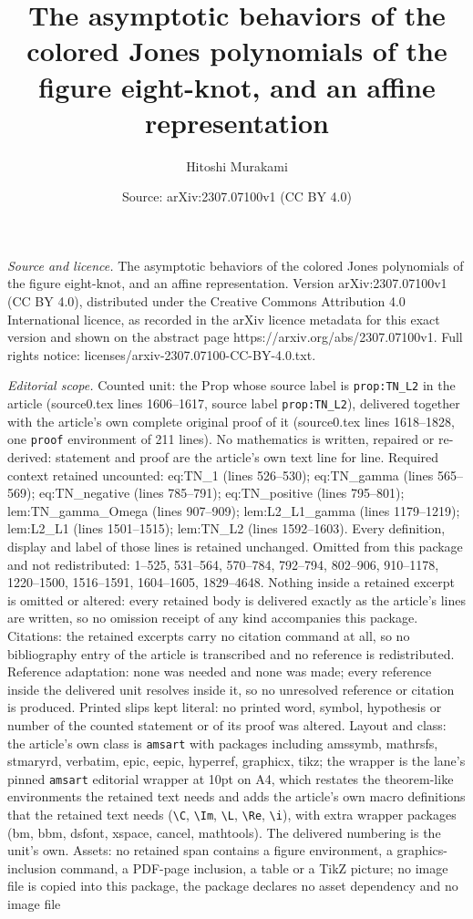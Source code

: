 \documentclass[10pt,a4paper]{amsart}
\title[The asymptotic behaviors of the colored Jones polynomials of]{The asymptotic behaviors of the colored Jones polynomials of the figure eight-knot, and an affine representation}
\author{Hitoshi Murakami}
\date{Source: arXiv:2307.07100v1 (CC BY 4.0)}
\begin{document}
\maketitle

\noindent\emph{Source and licence.} The asymptotic behaviors of the colored Jones polynomials of the figure eight-knot, and an affine representation. Version arXiv:2307.07100v1 (CC BY 4.0), distributed under the Creative Commons Attribution 4.0 International licence, as recorded in the arXiv licence metadata for this exact version and shown on the abstract page https://arxiv.org/abs/2307.07100v1. Full rights notice: licenses/arxiv-2307.07100-CC-BY-4.0.txt.\par\smallskip

\noindent\textit{Editorial scope.} Counted unit: the Prop whose source label is \texttt{prop:TN\_L2} in the article (source0.tex lines 1606--1617, source label \texttt{prop:TN\_L2}), delivered together with the article's own complete original proof of it (source0.tex lines 1618--1828, one \texttt{proof} environment of 211 lines). No mathematics is written, repaired or re-derived: statement and proof are the article's own text line for line. Required context retained uncounted: eq:TN\_1 (lines 526--530); eq:TN\_gamma (lines 565--569); eq:TN\_negative (lines 785--791); eq:TN\_positive (lines 795--801); lem:TN\_gamma\_Omega (lines 907--909); lem:L2\_L1\_gamma (lines 1179--1219); lem:L2\_L1 (lines 1501--1515); lem:TN\_L2 (lines 1592--1603). Every definition, display and label of those lines is retained unchanged. Omitted from this package and not redistributed: 1--525, 531--564, 570--784, 792--794, 802--906, 910--1178, 1220--1500, 1516--1591, 1604--1605, 1829--4648. Nothing inside a retained excerpt is omitted or altered: every retained body is delivered exactly as the article's lines are written, so no omission receipt of any kind accompanies this package. Citations: the retained excerpts carry no citation command at all, so no bibliography entry of the article is transcribed and no reference is redistributed. Reference adaptation: none was needed and none was made; every reference inside the delivered unit resolves inside it, so no unresolved reference or citation is produced. Printed slips kept literal: no printed word, symbol, hypothesis or number of the counted statement or of its proof was altered. Layout and class: the article's own class is \texttt{amsart} with packages including amssymb, mathrsfs, stmaryrd, verbatim, epic, eepic, hyperref, graphicx, tikz; the wrapper is the lane's pinned \texttt{amsart} editorial wrapper at 10pt on A4, which restates the theorem-like environments the retained text needs and adds the article's own macro definitions that the retained text needs (\texttt{\textbackslash C}, \texttt{\textbackslash Im}, \texttt{\textbackslash L}, \texttt{\textbackslash Re}, \texttt{\textbackslash i}), with extra wrapper packages (bm, bbm, dsfont, xspace, cancel, mathtools). The delivered numbering is the unit's own. Assets: no retained span contains a figure environment, a graphics-inclusion command, a PDF-page inclusion, a table or a TikZ picture; no image file is copied into this package, the package declares no asset dependency and no image file 
\end{document}
